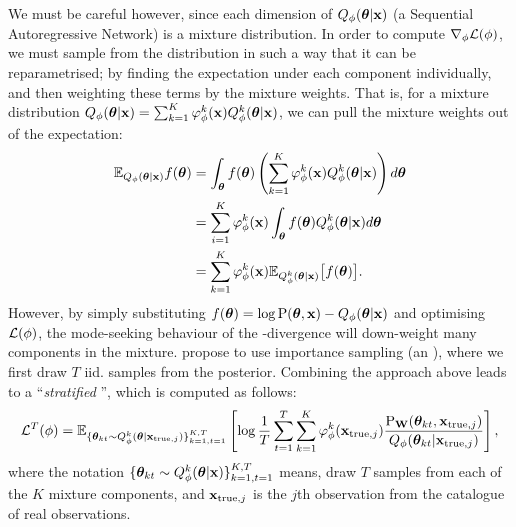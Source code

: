 \documentclass[a4paper]{article}
\newcommand*\acr[1]{\textscale{.85}{#1}} %
\newcommand{\P}{\mathrm{P}}
\begin{document}
We must be careful however, since each dimension of $Q_\phi({\bm{\theta}} \vert {\mathbf{x}})$
(a Sequential Autoregressive Network) is a mixture distribution. In order to
compute $\nabla_\phi {\mathcal{L}}(\phi)$, we must sample from the distribution in such a
way that it can be reparametrised; by finding the expectation under each component
individually, and then weighting these terms by the mixture weights. That is,
for a mixture distribution $Q_\phi({\bm{\theta}} \vert {\mathbf{x}}) =
\sum^K_{k=1}\varphi^k_\phi({\mathbf{x}})Q_\phi^k({\bm{\theta}} \vert {\mathbf{x}})$, we can pull the mixture
weights out of the expectation:
\begin{align}
    \mathbb{E}_{Q_\phi({\bm{\theta}} \vert {\mathbf{x}})}f({\bm{\theta}}) &= \int_{\bm{\theta}}
    f({\bm{\theta}})\left(\sum^K_{k=1}\varphi^k_\phi({\mathbf{x}})Q_\phi^k({\bm{\theta}} \vert {\mathbf{x}})\right)
    d{\bm{\theta}} \\
                                                &= \sum^K_{i=1}\varphi^k_\phi({\mathbf{x}})
                                                \int_{\bm{\theta}} f({\bm{\theta}})
                                                Q^k_\phi({\bm{\theta}} \vert
                                                {\mathbf{x}})d{\bm{\theta}} \\
                                                &= \sum^K_{k=1}\varphi^k_\phi({\mathbf{x}})
                                                \mathbb{E}_{Q^k_\phi({\bm{\theta}} \vert
                                                {\mathbf{x}})}\big[f({\bm{\theta}})\big].
\end{align}
However, by simply substituting $f(\rvtheta) = \log \P(\rvtheta, \rvx) -
Q_\phi(\rvtheta \vert \rvx)$ and optimising ${\mathcal{L}}(\phi)$, the mode-seeking
behaviour of the \acr{KL}-divergence will down-weight many components in the
mixture. \cite{roederStickingLandingSimple2017} propose to use importance
sampling (an \acr{IWAE}), where we first draw $T$ iid. samples from the
posterior. Combining the approach above leads to a ``\emph{stratified}
\acr{IWAE}'', %
which is computed as follows:
\begin{equation}
    \gL^T(\phi) = \E_{\{\rvtheta_{kt}\sim Q^k_\phi(\rvtheta \vert
        \rvx_{\text{true},j})\}^{K, T}_{k=1, t=1}}\left[
        \log
        \frac{1}{T}\sum^T_{t=1}\sum^K_{k=1}\varphi^k_{\phi}(\rvx_{\text{true},j})\frac{\P_{\rmW}(\rvtheta_{kt},
        \rvx_{\text{true},j})}{Q_\phi(\rvtheta_{kt} \vert \rvx_{\text{true},j})}
    \right],
\end{equation}
where the notation $\{{\bm{\theta}}_{kt}\sim Q^k_\phi({\bm{\theta}} \vert {\mathbf{x}})\}^{K,
T}_{k=1, t=1}$ means, draw $T$ samples from each of the $K$ mixture components,
and ${\mathbf{x}}_{\text{true}, j}$ is the $j$th observation from the catalogue of real
observations.


\end{document}
